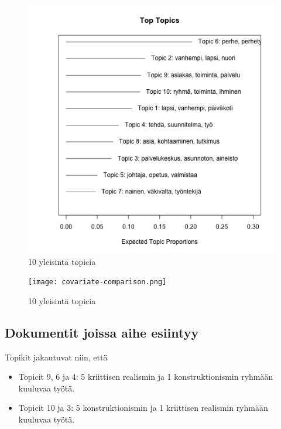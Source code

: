 

\begin{center}
\begin{figure}[ht!]

\includegraphics{top_topics.png}

\caption{10 yleisintä topicia}
\label{kuvio1}
\end{figure}
\end{center}




\begin{center}
\begin{figure}[ht!]

\texttt{[image: covariate-comparison.png]}

\caption{10 yleisintä topicia}
\label{kuvio2}

\end{figure}
\end{center}

\subsection*{Dokumentit joissa aihe esiintyy}

Topikit jakautuvat niin, että

\begin{itemize}

\item Topicit 9, 6 ja  4: 5 kriittisen realismin ja 1 konstruktionismin ryhmään
  kuuluvaa työtä.

\item Topicit 10 ja 3: 5 konstruktionismin ja 1 kriittisen realismin ryhmään
  kuuluvaa työtä.

\end{itemize}

